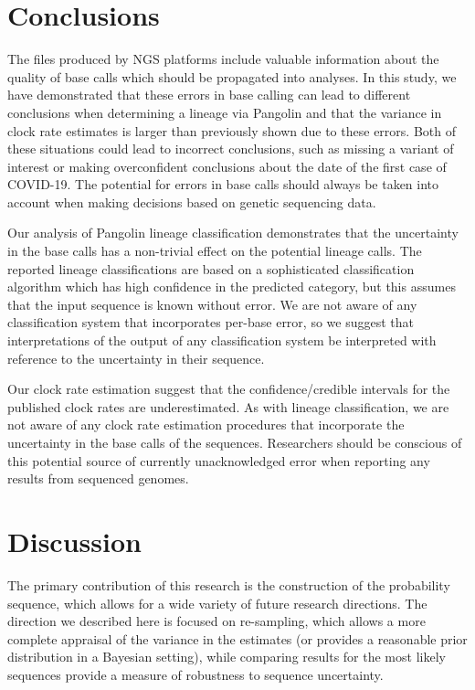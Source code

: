 \documentclass[12pt]{article}
\begin{document}
\section{Conclusions}

The files produced by NGS platforms include valuable information about the quality of base calls which should be propagated into analyses.
In this study, we have demonstrated that these errors in base calling can lead to different conclusions when determining a lineage via Pangolin and that the variance in clock rate estimates is larger than previously shown due to these errors.
Both of these situations could lead to incorrect conclusions, such as missing a variant of interest or making overconfident conclusions about the date of the first case of COVID-19.
The potential for errors in base calls should always be taken into account when making decisions based on genetic sequencing data.

Our analysis of Pangolin lineage classification demonstrates that the uncertainty in the base calls has a non-trivial effect on the potential lineage calls.
The reported lineage classifications are based on a sophisticated classification algorithm which has high confidence in the predicted category, but this assumes that the input sequence is known without error.
We are not aware of any classification system that incorporates per-base error, so we suggest that interpretations of the output of any classification system be interpreted with reference to the uncertainty in their sequence.

Our clock rate estimation suggest that the confidence/credible intervals for the published clock rates are underestimated.
As with lineage classification, we are not aware of any clock rate estimation procedures that incorporate the uncertainty in the base calls of the sequences.
Researchers should be conscious of this potential source of currently unacknowledged error when reporting any results from sequenced genomes.

\section{Discussion}

The primary contribution of this research is the construction of the probability sequence, which allows for a wide variety of future research directions.
The direction we described here is focused on re-sampling, which allows a more complete appraisal of the variance in the estimates (or provides a reasonable prior distribution in a Bayesian setting), while comparing results for the most likely sequences provide a measure of robustness to sequence uncertainty.
\end{document}
